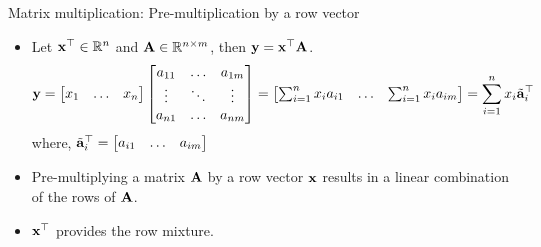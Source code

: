 \documentclass[aspectratio=169]{beamer}
\begin{document}
\begin{frame}[t]{Matrix multiplication: Pre-multiplication by a row vector}
  \begin{itemize}
    \item Let $\mathbf{x}^{\top} \in \mathbb{R}^{n}$ and $\mathbf{A} \in \mathbb{R}^{n \times m}$, then $\mathbf{y} = \mathbf{x}^{\top}\mathbf{A}$.
    \[ \mathbf{y} = \begin{bmatrix}
      x_1 & \ldots & x_n
    \end{bmatrix} \begin{bmatrix}
      a_{11} & \ldots & a_{1m} \\
      \vdots & \ddots & \vdots \\
      a_{n1} & \ldots & a_{nm} \\
    \end{bmatrix} = \begin{bmatrix} \sum_{i=1}^{n} x_i a_{i1} & \ldots & \sum_{i=1}^{n} x_i a_{im}
    \end{bmatrix} = \sum_{i=1}^n x_i \tilde{\mathbf{a}}_i^\top \]
    where, $\tilde{\mathbf{a}}_i^\top = \begin{bmatrix}
      a_{i1} & \ldots & a_{im}\end{bmatrix}$
      \item Pre-multiplying a matrix $\mathbf{A}$ by a row vector $\mathbf{x}$ results in a linear combination of the rows of $\mathbf{A}$.
      
      \item $\mathbf{x}^\top$ provides the row mixture.
  \end{itemize}
\end{frame}
  
\end{document}
